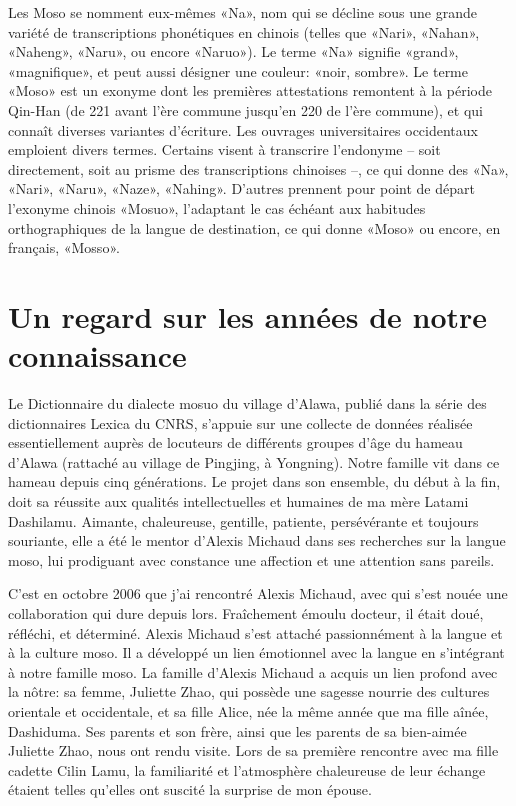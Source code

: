 Les Moso se nomment eux-mêmes «Na», nom qui se décline sous une grande variété de transcriptions phonétiques en chinois (telles que «Nari», «Nahan», «Naheng», «Naru», ou encore «Naruo»). Le terme «Na» signifie «grand», «magnifique», et peut aussi désigner une couleur: «noir, sombre». Le terme «Moso» est un exonyme dont les premières attestations remontent à la période Qin-Han (de 221 avant l’ère commune jusqu’en 220 de l’ère commune), et qui connaît diverses variantes d’écriture. Les ouvrages universitaires occidentaux emploient divers termes. Certains visent à transcrire l’endonyme – soit directement, soit au prisme des transcriptions chinoises –, ce qui donne des «Na», «Nari», «Naru», «Naze», «Nahing». D’autres prennent pour point de départ l’exonyme chinois  «Mosuo», l’adaptant le cas échéant aux habitudes orthographiques de la langue de destination, ce qui donne «Moso» ou encore, en français, «Mosso».


\section*{Un regard sur les années de notre connaissance}

Le Dictionnaire du dialecte mosuo du village d'Alawa, publié dans la série des dictionnaires Lexica du CNRS, s'appuie sur une collecte de données réalisée essentiellement auprès de locuteurs de différents groupes d'âge du hameau d'Alawa (rattaché au village de Pingjing, à Yongning). Notre famille vit dans ce hameau depuis cinq générations. Le projet dans son ensemble, du début à la fin, doit sa réussite aux qualités intellectuelles et humaines de ma mère Latami Dashilamu. Aimante, chaleureuse, gentille, patiente, persévérante et toujours souriante, elle a été le mentor d’Alexis Michaud dans ses recherches sur la langue moso, lui prodiguant avec constance une affection et une attention sans pareils.

C'est en octobre 2006 que j'ai rencontré Alexis Michaud, avec qui s’est nouée une collaboration qui dure depuis lors. Fraîchement émoulu docteur, il était doué, réfléchi, et déterminé. Alexis Michaud s’est attaché passionnément à la langue et à la culture moso. Il a développé un lien émotionnel avec la langue en s'intégrant à notre famille moso. La famille d’Alexis Michaud a acquis un lien profond avec la nôtre: sa femme, Juliette Zhao, qui possède une sagesse nourrie des cultures orientale et occidentale, et sa fille Alice, née la même année que ma fille aînée, Dashiduma. Ses parents et son frère, ainsi que les parents de sa bien-aimée Juliette Zhao, nous ont rendu visite. Lors de sa première rencontre avec ma fille cadette Cilin Lamu, la familiarité et l'atmosphère chaleureuse de leur échange étaient telles qu'elles ont suscité la surprise de mon épouse.

